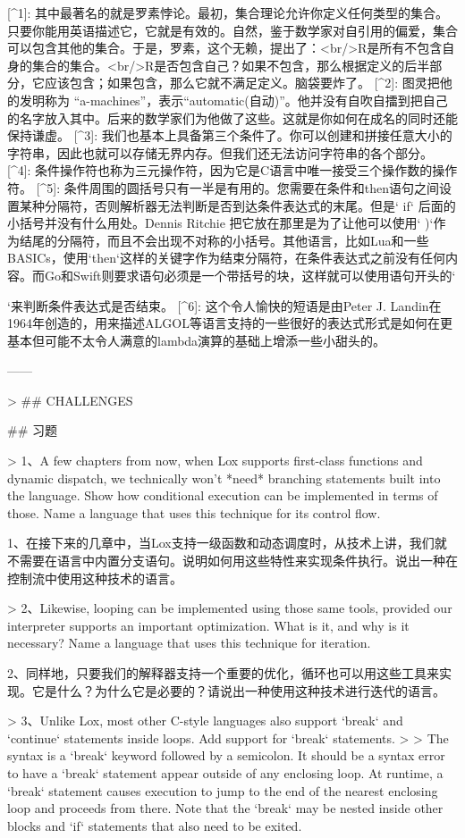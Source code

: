 \documentclass[cn,11pt,chinese]{elegantbook}
\begin{document}
[^1]: 其中最著名的就是罗素悖论。最初，集合理论允许你定义任何类型的集合。只要你能用英语描述它，它就是有效的。自然，鉴于数学家对自引用的偏爱，集合可以包含其他的集合。于是，罗素，这个无赖，提出了：<br/>R是所有不包含自身的集合的集合。<br/>R是否包含自己？如果不包含，那么根据定义的后半部分，它应该包含；如果包含，那么它就不满足定义。脑袋要炸了。
[^2]: 图灵把他的发明称为 “a-machines”，表示“automatic(自动)”。他并没有自吹自擂到把自己的名字放入其中。后来的数学家们为他做了这些。这就是你如何在成名的同时还能保持谦虚。
[^3]: 我们也基本上具备第三个条件了。你可以创建和拼接任意大小的字符串，因此也就可以存储无界内存。但我们还无法访问字符串的各个部分。
[^4]: 条件操作符也称为三元操作符，因为它是C语言中唯一接受三个操作数的操作符。
[^5]: 条件周围的圆括号只有一半是有用的。您需要在条件和then语句之间设置某种分隔符，否则解析器无法判断是否到达条件表达式的末尾。但是` if` 后面的小括号并没有什么用处。Dennis Ritchie 把它放在那里是为了让他可以使用` )`作为结尾的分隔符，而且不会出现不对称的小括号。其他语言，比如Lua和一些BASICs，使用`then`这样的关键字作为结束分隔符，在条件表达式之前没有任何内容。而Go和Swift则要求语句必须是一个带括号的块，这样就可以使用语句开头的`{`来判断条件表达式是否结束。
[^6]: 这个令人愉快的短语是由Peter J. Landin在1964年创造的，用来描述ALGOL等语言支持的一些很好的表达式形式是如何在更基本但可能不太令人满意的lambda演算的基础上增添一些小甜头的。



------

> ## CHALLENGES

## 习题

> 1、A few chapters from now, when Lox supports first-class functions and dynamic dispatch, we technically won’t *need* branching statements built into the language. Show how conditional execution can be implemented in terms of those. Name a language that uses this technique for its control flow.

1、在接下来的几章中，当Lox支持一级函数和动态调度时，从技术上讲，我们就不需要在语言中内置分支语句。说明如何用这些特性来实现条件执行。说出一种在控制流中使用这种技术的语言。

> 2、Likewise, looping can be implemented using those same tools, provided our interpreter supports an important optimization. What is it, and why is it necessary? Name a language that uses this technique for iteration.

2、同样地，只要我们的解释器支持一个重要的优化，循环也可以用这些工具来实现。它是什么？为什么它是必要的？请说出一种使用这种技术进行迭代的语言。

> 3、Unlike Lox, most other C-style languages also support `break` and `continue` statements inside loops. Add support for `break` statements.
>
> The syntax is a `break` keyword followed by a semicolon. It should be a syntax error to have a `break` statement appear outside of any enclosing loop. At runtime, a `break` statement causes execution to jump to the end of the nearest enclosing loop and proceeds from there. Note that the `break` may be nested inside other blocks and `if` statements that also need to be exited.

}
\end{document}
